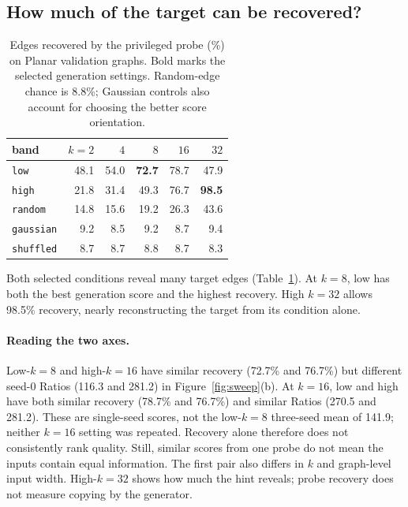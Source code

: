 \documentclass[11pt]{article}
\begin{document}
\subsection{How much of the target can be recovered?}
\label{sec:leakage}
\begin{table}[t]
\centering\small
\setlength{\tabcolsep}{4pt}
\begin{tabular}{lrrrrr}
\toprule
band & $k{=}2$ & $4$ & $8$ & $16$ & $32$ \\
\midrule
\texttt{low} & 48.1 & 54.0 & \textbf{72.7} & 78.7 & 47.9 \\
\texttt{high} & 21.8 & 31.4 & 49.3 & 76.7 & \textbf{98.5} \\
\texttt{random} & 14.8 & 15.6 & 19.2 & 26.3 & 43.6 \\
\texttt{gaussian} & 9.2 & 8.5 & 9.2 & 8.7 & 9.4 \\
\texttt{shuffled} & 8.7 & 8.7 & 8.8 & 8.7 & 8.3 \\
\bottomrule
\end{tabular}
\caption{Edges recovered by the privileged probe (\%) on Planar validation graphs. Bold marks
the selected generation settings. Random-edge chance is 8.8\%; Gaussian controls also account
for choosing the better score orientation.}
\label{tab:leakage}
\end{table}

Both selected conditions reveal many target edges (Table~\ref{tab:leakage}). At $k{=}8$,
low has both the best generation score and the highest recovery. High $k{=}32$ allows
98.5\% recovery, nearly reconstructing the target from its condition alone.

\paragraph{Reading the two axes.} Low-$k{=}8$ and high-$k{=}16$ have similar recovery
(72.7\% and 76.7\%) but different seed-0 Ratios (116.3 and 281.2) in Figure~\ref{fig:sweep}(b).
At $k{=}16$, low and high have both similar recovery (78.7\% and 76.7\%) and similar Ratios
(270.5 and 281.2). These are single-seed scores, not the low-$k{=}8$ three-seed mean of
141.9; neither $k{=}16$ setting was repeated. Recovery alone therefore does not consistently
rank quality. Still, similar scores from one probe do not mean the inputs contain equal
information. The first pair also differs in $k$ and graph-level input width. High-$k{=}32$
shows how much the hint reveals; probe recovery does not measure copying by the generator.
\end{document}
